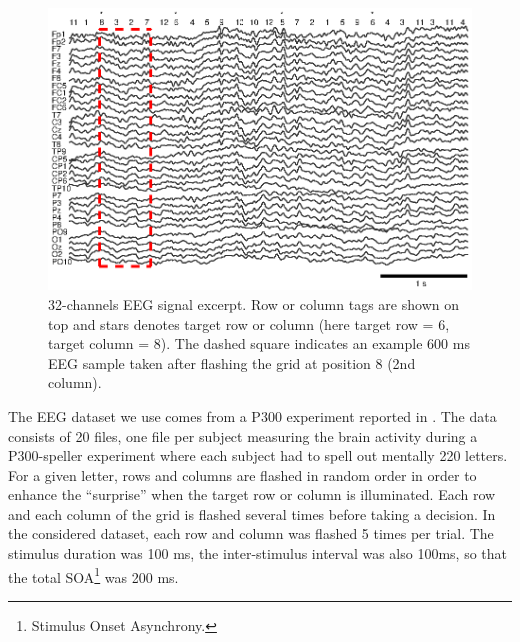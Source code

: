 \documentclass[conference]{IEEEtran}
\begin{document}
\begin{figure}
\centerline{
 \includegraphics[width=\linewidth]{figs-copie/fig_EEG}
}
\caption{32-channels EEG signal excerpt. 
Row or column tags are shown on top and stars denotes target row or column (here target row = 6, target column = 8).
The dashed square indicates an example 600 ms EEG sample taken after flashing the grid at position 8 (2nd column).}
\label{fig:EEG}
\end{figure}

The EEG dataset we use comes from a P300 experiment reported in \cite{Maby10}. 
The data consists of 20 files, one file per subject
measuring the brain activity during a P300-speller
experiment where
each subject had to spell out mentally 220 letters. 
For a given letter, rows and columns are flashed in random order
in order to enhance the ``surprise'' when the target row or column
is illuminated.
Each row and each column of the grid 
is flashed several times before taking a decision.
In the considered dataset, each row and column was flashed 5 times per trial.
The stimulus duration was 100 ms, the inter-stimulus interval was also 100ms,
so that the total SOA\footnote{Stimulus Onset Asynchrony.} was 200 ms.
\end{document}
